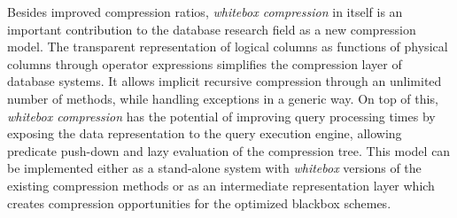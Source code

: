 \noindent
Besides improved compression ratios, \textit{whitebox compression} in itself is an important contribution to the database research field as a new compression model. The transparent representation of logical columns as functions of physical columns through operator expressions simplifies the compression layer of database systems. It allows implicit recursive compression through an unlimited number of methods, while handling exceptions in a generic way. On top of this, \textit{whitebox compression} has the potential of improving query processing times by exposing the data representation to the query execution engine, allowing predicate push-down and lazy evaluation of the compression tree. This model can be implemented either as a stand-alone system with \textit{whitebox} versions of the existing compression methods or as an intermediate representation layer which creates compression opportunities for the optimized blackbox schemes.

\iffalse
\fi

